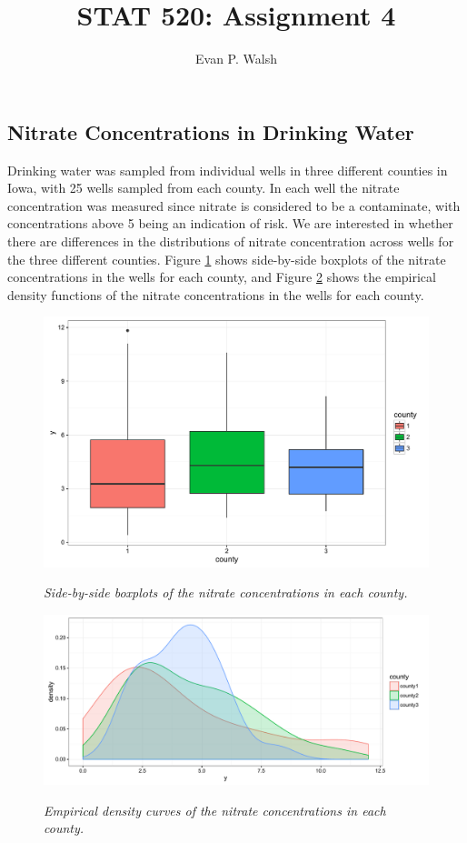 \documentclass[12pt]{article}
\title{STAT 520: Assignment 4}
\author{Evan P. Walsh}
\begin{document}

\subsection*{Nitrate Concentrations in Drinking Water}

Drinking water was sampled from individual wells in three different counties in Iowa, with 25 wells sampled from each county. In each well the nitrate
concentration was measured since nitrate is considered to be a contaminate, with concentrations above 5 being an indication of risk.
We are interested in whether there are differences in the distributions of nitrate concentration across wells for the three different counties.
Figure \ref{boxplot} shows side-by-side boxplots of the nitrate concentrations in the wells for each county, and Figure \ref{density} shows the empirical density
functions of the nitrate concentrations in the wells for each county.

\begin{figure}[h]
  \caption{\emph{Side-by-side boxplots of the nitrate concentrations in each county.}}
  \centering
  \includegraphics[width=.7\textwidth]{./figures/hw04_boxplots.pdf}
  \label{boxplot}
\end{figure}

\begin{figure}[h]
  \caption{\emph{Empirical density curves of the nitrate concentrations in each county.}}
  \centering
  \includegraphics[width=.9\textwidth]{./figures/hw04_density.pdf}
  \label{density}
\end{figure}
\end{document}
